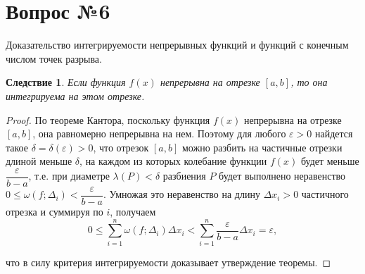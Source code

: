 \documentclass[12pt]{article}
\numberwithin{equation}{section}
\newtheorem{remark}{Следствие}[section]
\begin{document}
\section{Вопрос №6} %
\begin{framed}
Доказательство интегрируемости непрерывных функций и функций с конечным числом
точек разрыва.
\end{framed}
\begin{remark}Если функция $f(x)$ непрерывна на отрезке $[a,b]$, то она интегрируема на этом отрезке.
\end{remark}
\begin{proof}
По теореме Кантора, поскольку функция $f(x)$ непрерывна на отрезке $[a,b]$, она равномерно непрерывна на нем. Поэтому для любого $\varepsilon > 0$ найдется такое $\delta = \delta(\varepsilon) > 0$, что отрезок $[a,b]$ можно разбить на частичные отрезки длиной меньше $\delta$, на каждом из которых колебание функции $f(x)$ будет меньше $\dfrac{\varepsilon}{b - a}$, т.е. при диаметре $\lambda(P) < \delta$ разбиения $P$ будет выполнено неравенство $0 \leqslant \omega(f; \Delta_i) < \dfrac{\varepsilon}{b-a}$. Умножая это неравенство на длину $\Delta x_i > 0$  частичного отрезка и суммируя по $i$, получаем
\[ 0 \leqslant \sum_{i = 1}^n \omega(f; \Delta_i) \Delta x_i < \sum_{i = 1}^n \frac{\varepsilon}{b-a} \Delta x_i = \varepsilon,\]

что в силу критерия интегрируемости доказывает утверждение теоремы.
\end{proof}
\end{document}
